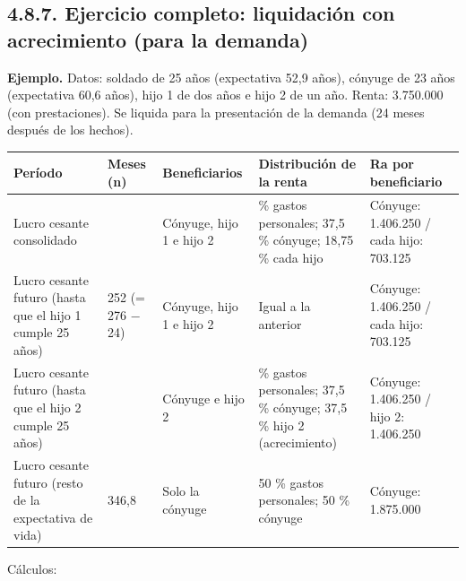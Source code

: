 \subsection{4.8.7. Ejercicio completo: liquidación con acrecimiento (para la demanda)}
\begin{ejemplo}
\textcolor[HTML]{4F6228}{\textbf{Ejemplo. }}Datos: soldado de 25 años (expectativa 52,9 años), cónyuge de 23 años (expectativa 60,6 años), hijo 1 de dos años e hijo 2 de un año. Renta: 3.750.000 (con prestaciones). Se liquida para la presentación de la demanda (24 meses después de los hechos).
\end{ejemplo}
\begin{tabla}
\begin{longtable}{|>{\raggedright\arraybackslash}m{}|>{\raggedright\arraybackslash}m{}|>{\raggedright\arraybackslash}m{}|>{\raggedright\arraybackslash}m{}|>{\raggedright\arraybackslash}m{}|}
\hline
\cellcolor[HTML]{1F3864}\textcolor[HTML]{FFFFFF}{\textbf{Período}} & \cellcolor[HTML]{1F3864}\textcolor[HTML]{FFFFFF}{\textbf{Meses (n)}} & \cellcolor[HTML]{1F3864}\textcolor[HTML]{FFFFFF}{\textbf{Beneficiarios}} & \cellcolor[HTML]{1F3864}\textcolor[HTML]{FFFFFF}{\textbf{Distribución de la renta}} & \cellcolor[HTML]{1F3864}\textcolor[HTML]{FFFFFF}{\textbf{Ra por beneficiario}} \\ \hline
Lucro cesante consolidado & 24 & Cónyuge, hijo 1 e hijo 2 & 25 \% gastos personales; 37,5 \% cónyuge; 18,75 \% cada hijo & Cónyuge: 1.406.250 / cada hijo: 703.125 \\ \hline
\cellcolor[HTML]{F2F5FA}Lucro cesante futuro (hasta que el hijo 1 cumple 25 años) & \cellcolor[HTML]{F2F5FA}252 (= 276 − 24) & \cellcolor[HTML]{F2F5FA}Cónyuge, hijo 1 e hijo 2 & \cellcolor[HTML]{F2F5FA}Igual a la anterior & \cellcolor[HTML]{F2F5FA}Cónyuge: 1.406.250 / cada hijo: 703.125 \\ \hline
Lucro cesante futuro (hasta que el hijo 2 cumple 25 años) & 12 & Cónyuge e hijo 2 & 25 \% gastos personales; 37,5 \% cónyuge; 37,5 \% hijo 2 (acrecimiento) & Cónyuge: 1.406.250 / hijo 2: 1.406.250 \\ \hline
\cellcolor[HTML]{F2F5FA}Lucro cesante futuro (resto de la expectativa de vida) & \cellcolor[HTML]{F2F5FA}346,8 & \cellcolor[HTML]{F2F5FA}Solo la cónyuge & \cellcolor[HTML]{F2F5FA}50 \% gastos personales; 50 \% cónyuge & \cellcolor[HTML]{F2F5FA}Cónyuge: 1.875.000 \\ \hline
\end{longtable}
\end{tabla}
Cálculos:


